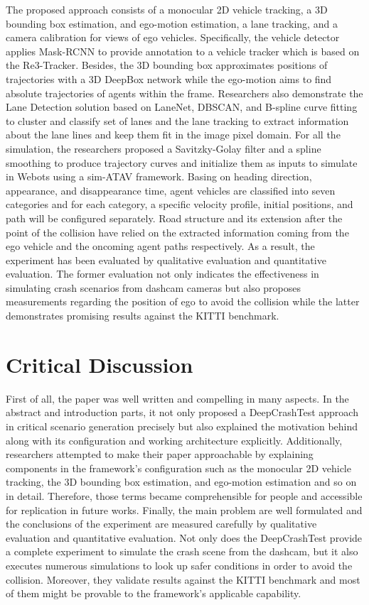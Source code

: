\documentclass[10pt,a4paper]{report}
\begin{document}
The proposed approach consists of a monocular 2D vehicle tracking, a 3D bounding box estimation, and ego-motion estimation, a lane tracking, and a camera calibration for views of ego vehicles.
%
Specifically, the vehicle detector applies Mask-RCNN to provide annotation to a vehicle tracker which is based on the Re3-Tracker. 
%
Besides, the 3D bounding box approximates positions of trajectories with a 3D DeepBox network while the ego-motion aims to find absolute trajectories of agents within the frame.
%
Researchers also demonstrate the Lane Detection solution based on LaneNet, DBSCAN, and B-spline curve fitting to cluster and classify set of lanes and the lane tracking to extract information about the lane lines and keep them fit in the image pixel domain.
%
For all the simulation, the researchers proposed a Savitzky-Golay filter and a spline smoothing to produce trajectory curves and initialize them as inputs to simulate in Webots using a sim-ATAV framework.
%
Basing on heading direction, appearance, and disappearance time, agent vehicles are classified into seven categories and for each category, a specific velocity profile, initial positions, and path will be configured separately.
%
Road structure and its extension after the point of the collision have relied on the extracted information coming from the ego vehicle and the oncoming agent paths respectively.
%
As a result, the experiment has been evaluated by qualitative evaluation and quantitative evaluation.
%
The former evaluation not only indicates the effectiveness in simulating crash scenarios from dashcam cameras but also proposes measurements regarding the position of ego to avoid the collision
%
while the latter demonstrates promising results against the KITTI benchmark.

\section{Critical Discussion}
First of all, the paper was well written and compelling in many aspects. In the abstract and introduction parts, it not only proposed a DeepCrashTest approach in critical scenario generation precisely but also explained the motivation behind along with its configuration and working architecture explicitly.
%
Additionally, researchers attempted to make their paper approachable by explaining components in the framework's configuration such as the monocular 2D vehicle tracking, the 3D bounding box estimation, and ego-motion estimation and so on in detail.
%
Therefore, those terms became comprehensible for people and accessible for replication in future works.
%
Finally, the main problem are well formulated and the conclusions of the experiment are measured carefully by qualitative evaluation and quantitative evaluation. 
%
Not only does the DeepCrashTest provide a complete experiment to simulate the crash scene from the dashcam, but it also executes numerous simulations to look up safer conditions in order to avoid the collision.
%
Moreover, they validate results against the KITTI benchmark and most of them might be provable to the framework's applicable capability.
%
\end{document}
